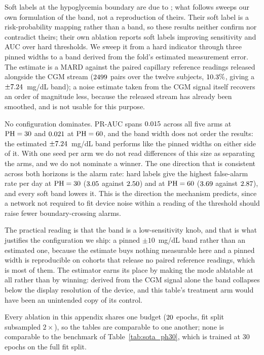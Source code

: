 

Soft labels at the hypoglycemia boundary are due to \citet{fang2026glucose}; what
follows sweeps our own formulation of the band, not a reproduction of theirs.
Their soft label is a risk-probability mapping rather than a band, so these
results neither confirm nor contradict theirs; their own ablation reports soft
labels improving sensitivity and AUC over hard thresholds. We
sweep it from a hard indicator through three pinned widths to a band derived from
the fold's estimated measurement error. The estimate is a
MARD against the paired capillary reference readings released alongside the CGM
stream ($2499$ pairs over the twelve subjects, $10.3\%$,
giving a $\pm7.24$~mg/dL band); a noise estimate taken from the CGM
signal itself recovers an order of magnitude less, because the released stream
has already been smoothed, and is not usable for this purpose.

No configuration dominates. PR-AUC spans $0.015$ across all
five arms at $\mathrm{PH} = 30$ and $0.021$ at $\mathrm{PH} = 60$, and the
band width does not order the results: the estimated $\pm7.24$~mg/dL
band performs like the pinned widths on either side of it. With one seed per arm
we do not read differences of this size as separating the arms, and we do not
nominate a winner. The one direction that is consistent across both horizons is
the alarm rate: hard labels give the highest false-alarm rate per day at
$\mathrm{PH} = 30$ ($3.05$ against $2.50$) and at
$\mathrm{PH} = 60$ ($3.69$ against $2.87$), and every
soft band lowers it. This is the direction the mechanism predicts, since a
network not required to fit device noise within a reading of the threshold
should raise fewer boundary-crossing alarms.

The practical reading is that the band is a low-sensitivity knob, and that is
what justifies the configuration we ship: a pinned $\pm 10$~mg/dL band rather
than an estimated one, because the estimate buys nothing measurable here and a
pinned width is reproducible on cohorts that release no paired reference
readings, which is most of them. The estimator earns its place by making the
mode ablatable at all rather than by winning: derived from the CGM signal alone
the band collapses below the display resolution of the device, and this table's
treatment arm would have been an unintended copy of its control.

Every ablation in this appendix shares one budget ($20$ epochs, fit
split subsampled $2\times$), so the tables are comparable to one another; none is
comparable to the benchmark of Table~\ref{tab:sota_ph30}, which is trained at 30
epochs on the full fit split.
